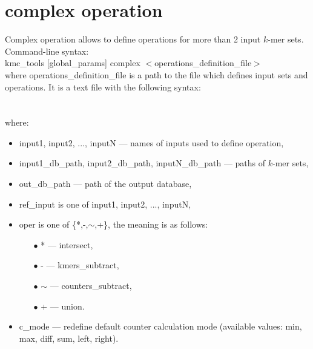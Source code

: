 \clearpage
\section{complex operation}
\label{sec:complex}

Complex operation allows to define operations for more than 2 input $k$-mer sets. \\
Command-line syntax: \\
kmc\_tools [global\_params] complex $<$operations\_definition\_file$>$ \\

where \textsf{operations\_definition\_file} is a path to the file which defines input sets and operations. It is a text file with the following syntax: \\ \\
\\ 

where: 
\begin{itemize}
	\item \textsf{input1, input2, ..., inputN} --- names of inputs used to define operation,
	\item \textsf{input1\_db\_path, input2\_db\_path, inputN\_db\_path} --- paths of $k$-mer sets,
	\item \textsf{out\_db\_path} --- path of the output database,
	\item \textsf{ref\_input} is one of \textsf{input1, input2, ..., inputN}, 
	\item \textsf{oper} is one of \textsf{\{*,-,$\sim$,+\}}, the meaning is as follows:
	\begin{itemize}
		\item[\tiny$\bullet$] \textsf{*} --- intersect,
		\item[\tiny$\bullet$] \textsf{-} --- kmers\_subtract,
		\item[\tiny$\bullet$] \textsf{$\sim$} --- counters\_subtract,
		\item[\tiny$\bullet$] \textsf{+} --- union.
	\end{itemize}
	\item \textsf{c\_mode} --- redefine default counter calculation mode (available values: min, max, diff, sum, left, right).
\end{itemize}

